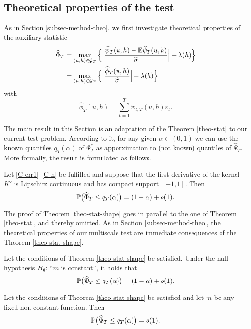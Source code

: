 \documentclass[a4paper,12pt]{article}
\numberwithin{equation}{section}
\begin{document}
\subsection{Theoretical properties of the test}\label{subsec-test-shape-theo}

As in Section \ref{subsec-method-theo}, we first investigate theoretical properties of the auxiliary statistic 
\begin{align*}
\widehat{\Phi}_T 
 & = \max_{(u,h) \in \mathcal{G}_T} \Big\{ \Big| \frac{\widehat{\psi}_T(u,h) - \mathbb{E} \widehat{\psi}_T(u,h)}{\widehat{\sigma}} \Big| - \lambda(h) \Big\} \\
 & = \max_{(u,h) \in \mathcal{G}_T} \Big\{ \Big| \frac{\widehat{\phi}_T(u,h)} {\widehat{\sigma}} \Big| - \lambda(h) \Big \} 
\end{align*}
with 
\[ \widehat{\phi}_T(u,h) = \sum\limits_{t=1}^T \widetilde{w}_{t,T}(u,h) \varepsilon_t. \]


The main result in this Section is an adaptation of the Theorem \ref{theo-stat} to our current test problem. According to it, for any given $\alpha \in (0,1)$ we can use the known quantiles $q_T(\alpha)$ of $\Phi_T^*$ as apporximation to (not known) quantiles of $\widehat{\Psi}_T$. More formally, the result is formulated as follows. 
\begin{theorem}\label{theo-stat-shape}
Let \ref{C-err1}--\ref{C-h} be fulfilled and suppose that the first derivative of the kernel $K'$ is Lipschitz continuous and has compact support $[-1,1]$. Then 
\[ \mathbb{P} \big( \widehat{\Phi}_T \le q_T(\alpha) \big) = (1 - \alpha) + o(1). \]
\end{theorem}
The proof of Theorem \ref{theo-stat-shape} goes in parallel to the one of Theorem \ref{theo-stat}, and thereby omitted.
\vspace{1pt}
As in Section \ref{subsec-method-theo}, the theoretical properties of our multiscale test are immediate consequences of the Theorem \ref{theo-stat-shape}. 
\begin{corollary}\label{corollary-test-shape-1}
Let the conditions of Theorem \ref{theo-stat-shape} be satisfied. Under the null hypothesis $H_0$: ``$m$ is constant'', it holds that 
\[ \mathbb{P} \big( \widehat{\Psi}_T \le q_T(\alpha) \big) = (1 - \alpha) + o(1). \]
\end{corollary}
\begin{corollary}\label{corollary-test-shape-2}
Let the conditions of Theorem \ref{theo-stat-shape} be satisfied and let $m$ be any fixed non-constant function. Then 
\[ \mathbb{P} \big( \widehat{\Psi}_T \le q_T(\alpha) \big) = o(1). \]
\end{corollary}
\end{document}
